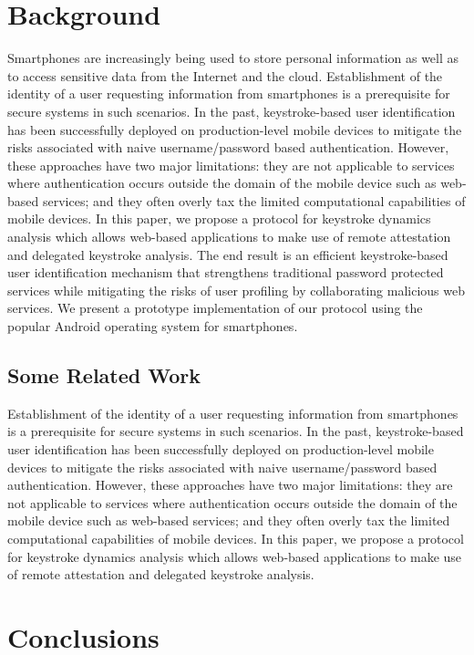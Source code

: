 \documentclass[twocolumn]{article}
\begin{document}
\section{Background} 
Smartphones are increasingly being used to store personal information as well as to access sensitive data from the Internet and the cloud. Establishment of the identity of a user requesting information from smartphones is a prerequisite for  secure systems in such scenarios. In the past, keystroke-based user identification has been successfully deployed on production-level mobile devices to mitigate the risks associated with naive username/password based authentication. However, these approaches have two major limitations: they are not applicable to services where authentication occurs outside the domain of the mobile
device such as web-based services; and they often overly tax the limited computational capabilities of mobile devices. In this paper, we propose a protocol for keystroke dynamics analysis which allows web-based applications to make use of remote attestation and\cite{nauman2011using} delegated keystroke analysis. The end result is an efficient keystroke-based user identification mechanism that strengthens traditional password protected services
while mitigating the risks of user profiling by \cite{se-cs-collab:nauman10}collaborating malicious web
services. We present a prototype implementation of our protocol using
the popular Android operating system for smartphones.\cite{seo2011user}

\subsection{Some Related Work} 
Establishment of the identity of a user requesting information from smartphones is a prerequisite for  secure systems in such scenarios. In the past, keystroke-based user identification has been successfully deployed on production-level mobile devices to mitigate the risks associated with naive username/password based authentication. However, these approaches have two major limitations: they are not applicable to services where authentication occurs outside the domain of the mobile
device such as web-based services; and they often overly tax the limited computational capabilities of mobile devices. In this paper, we propose a protocol for keystroke dynamics analysis which allows web-based applications to make use of remote attestation and delegated keystroke analysis.

\section{Conclusions}
\end{document}
